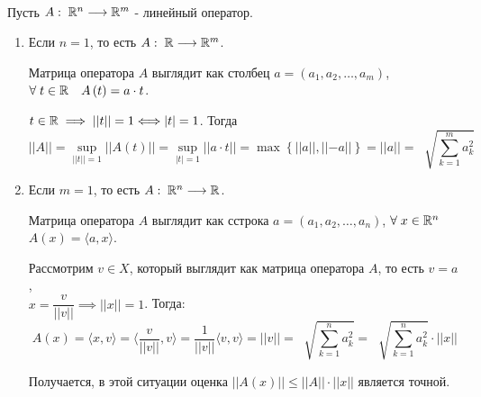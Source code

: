 \documentclass[../main.tex]{subfiles}
\begin{document}
\begin{examples}
    
    ~

    Пусть \( A:\; \mathbb{R} ^n \longrightarrow \mathbb{R} ^m\) - линейный оператор.
    \begin{enumerate}
        \item Если \( n=1\), то есть \( A:\; \mathbb{R} \longrightarrow \mathbb{R} ^m\). 
        \par Матрица оператора \( A\) выглядит как столбец \( a=\left( a_1, a_2, \ldots , a_m\right)\), \( \forall \; t \in \mathbb{R}\quad A\left( t\right)=a\cdot t\).
        \par \( t \in \mathbb{R} \implies \left| \left| t\right|\right|=1 \Longleftrightarrow \left| t\right|=1\). Тогда
        \[ \left| \left| A\right|\right|= \sup\limits_{ \left| \left| t\right|\right| =1} \left| \left| A\left( t\right)\right|\right|= \sup\limits_{ \left| t\right|=1} \left| \left| a\cdot t\right|\right|= \max\limits_{ } \left\{ \left| \left| a\right|\right|, \left| \left| -a\right|\right|\right\}= \left| \left| a\right|\right|= \;\sqrt[]{\sum\limits_{ k=1}^{ m} a_k^2}\]
        \item Если \( m=1\), то есть \( A:\; \mathbb{R} ^n \longrightarrow \mathbb{R} \).
        \par Матрица оператора \( A\) выглядит как сстрока \( a=\left( a_1, a_2, \ldots , a_n\right)\), \( \forall \; x \in \mathbb{R}^n \)\\\(A\left( x\right)= \langle a,x \rangle \).
        \par Рассмотрим \( v \in X\), который выглядит как матрица оператора \( A\), то есть \( v = a\), \\\( x = \dfrac{ v}{ \left| \left| v\right|\right|} \implies \left| \left| x\right|\right|=1\). Тогда:
        \[ A\left( x\right)= \langle x, v \rangle = \langle \dfrac{ v}{ \left| \left| v\right|\right|} , v \rangle= \dfrac{ 1}{ \left| \left| v\right|\right|} \langle v,v \rangle = \left| \left| v\right|\right|= \;\sqrt[]{ \sum\limits_{ k=1}^{ n} a_k^2}=\;\sqrt[]{ \sum\limits_{ k=1}^{ n} a_k^2} \cdot \left| \left| x\right|\right|\]
        \par Получается, в этой ситуации оценка \( \left| \left| A\left( x\right)\right|\right| \leq \left| \left| A\right|\right| \cdot \left| \left| x\right|\right|\) является точной.
    \end{enumerate}
\end{examples}
\end{document}
